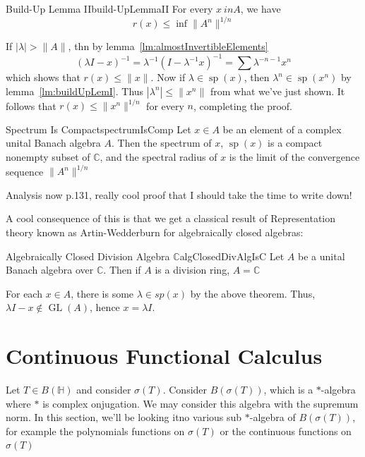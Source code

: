 \documentclass[oneside]{book}
\newcommand{\C}{\mathbb{C}}
\renewcommand{\H}{\mathbb{H}}
\renewcommand{\sp}{\operatorname{sp}}
\newcommand{\GL}{\operatorname{GL}}
\begin{document}
\begin{lem}{Build-Up Lemma II}{build-UpLemmaII}
	For every $x\ in A$, we have
	\[
		r(x) \le \inf\|A^n\|^{1/n}
	\]
\end{lem}

\begin{Proof}
	If $|\lambda| > \|A\|$, thn by lemma~\ref{lm:almostInvertibleElements}
	\[
		(\lambda I - x)^{-1} = \lambda^{-1}(I - \lambda^{-1} x)^{-1} = \sum \lambda^{-n-1}x^n
	\]
	which shows that $r(x) \le \|x\|$. Now if $\lambda \in \sp(x)$, then $\lambda^n \in \sp(x^n)$ by
	lemma~\ref{lm:buildUpLemI}. Thus $|\lambda^n| \le \|x^n\|$ from what we've just shown. It follows that $r(x)
	\le \|x^n\|^{1/n}$ for every $n$, completing the proof.
\end{Proof}

\begin{thm}{Spectrum Is Compact}{spectrumIsComp}
	Let $x \in A$ be an element of a complex unital Banach algebra $A$. Then the spectrum of $x$, $\sp(x)$ is
	a compact nonempty subset of $\C$, and the spectral radius of $x$ is the limit of the convergence sequence
	$\|A^n\|^{1/n}$
\end{thm}

\begin{Proof}
	Analysis now p.131, really cool proof that I should take the time to write down!
\end{Proof}

A cool consequence of this is that we get a classical result of  Representation theory known as Artin-Wedderburn for
algebraically closed algebras:

\begin{cor}{Algebraically Closed Division Algebra $\C$}{algClosedDivAlgIsC}
	Let $A$ be a unital Banach algebra over $\C$. Then if $A$ is a division ring, $A = \C$
\end{cor}

\begin{Proof}
	For each $x \in A$, there is some $\lambda \in sp(x)$ by the above theorem. Thus, $\lambda I - x \notin
	\GL(A)$,
	hence $x = \lambda I$.
\end{Proof}

\section{Continuous Functional Calculus}

Let $T \in B(\H)$ and consider $\sigma(T)$. Consider $B(\sigma(T))$, which is a $*$-algebra where $*$ is
complex onjugation. We may consider this algebra with the supremum norm. In this section, we'll be looking itno
various sub $*$-algebra of $B(\sigma(T))$, for example the polynomials functions on $\sigma(T)$ or the continuous
functions on $\sigma(T)$
\end{document}
